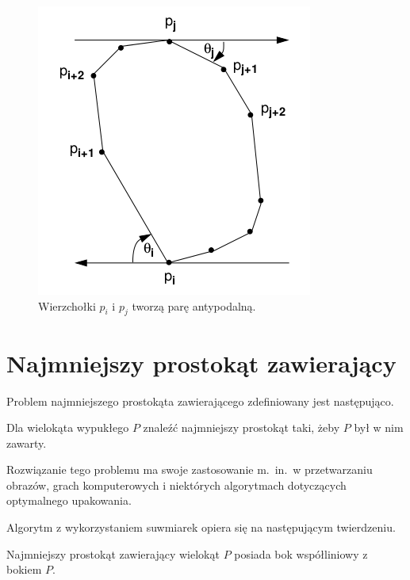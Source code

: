 \begin{figure}[tb]
  \centering
  \includegraphics[scale=0.5]{img/calipers1}
  \caption{\label{img:calipers1} Wierzchołki $p_i$ i $p_j$ tworzą parę
    antypodalną.}
\end{figure}

\section{Najmniejszy prostokąt zawierający}
Problem najmniejszego prostokąta zawierającego zdefiniowany jest
następująco.

\begin{problem}
  Dla wielokąta wypukłego $P$ znaleźć najmniejszy prostokąt taki, żeby
  $P$ był w nim zawarty.
\end{problem}

Rozwiązanie tego problemu ma swoje zastosowanie m.\ in.\ w
przetwarzaniu obrazów, grach komputerowych i niektórych algorytmach
dotyczących optymalnego upakowania.

Algorytm z wykorzystaniem suwmiarek opiera się na następującym
twierdzeniu.

\begin{twierdzenie}
  Najmniejszy prostokąt zawierający wielokąt $P$ posiada bok
  współliniowy z bokiem $P$.
\end{twierdzenie}

